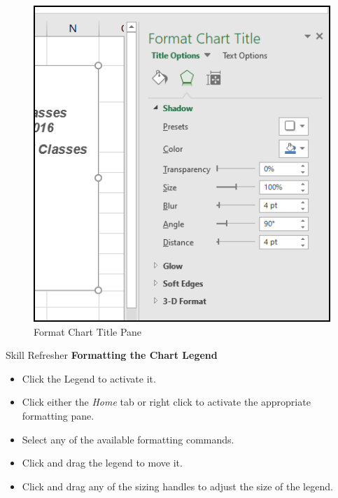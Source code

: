 \begin{figure}[H]
	\centering
	\includegraphics[width=\maxwidth{.75\linewidth}]{gfx/ch04_fig33}
	\caption{Format Chart Title Pane}
	\label{04:fig33}
\end{figure}

\begin{center}
	\begin{sklbox}{Skill Refresher}
		\textbf{Formatting the Chart Legend}
		\\
		\begin{itemize}
			\setlength{\itemsep}{0pt}
			\setlength{\parskip}{0pt}
			\setlength{\parsep}{0pt}

			\item Click the Legend to activate it.
			\item Click either the \textit{Home} tab or right click to activate the appropriate formatting pane.
			\item Select any of the available formatting commands.
			\item Click and drag the legend to move it.
			\item Click and drag any of the sizing handles to adjust the size of the legend.
			
		\end{itemize}
	\end{sklbox}
\end{center}

